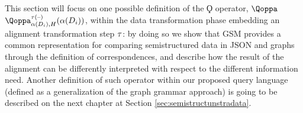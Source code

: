 This section will focus on one possible definition of the $\Qoppa$ operator, $\qtranslIndex{for nested schema alignment}$ $\qtransl^{\ttransl(\textup{--})}_{\abstr(D_i),H}(\abstr(D_i))$, within the data transformation phase embedding an alignment transformation step $\ttransl$:  by doing so we show that GSM provides a common representation for comparing semistructured data in JSON and graphs through the definition of correspondences, and describe how the result of the alignment can be differently interpreted with respect to the different information need. Another definition of such operator within our proposed query language (defined as a generalization of the graph grammar approach) is going to be described on the next chapter at Section \vref{sec:semistructunstradata}.

